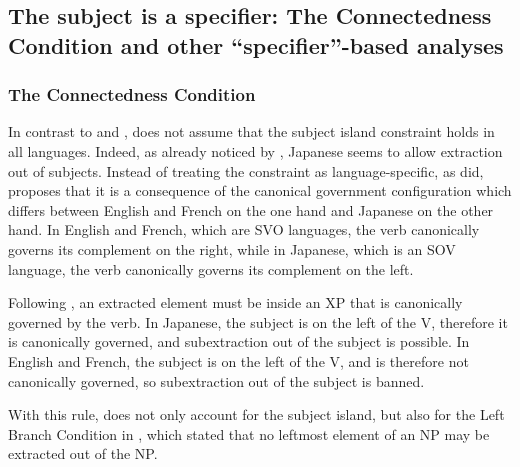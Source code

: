 
\subsection{The subject is a specifier: The Connectedness Condition and other ``specifier''-based analyses}

\subsubsection{The Connectedness Condition}

In contrast to \citeauthor{Chomsky.1973} and \citeauthor{Huang.1982}, \citet{Kayne.1983} does not assume that the subject island constraint holds in all languages. Indeed, as already noticed by \citet{Ross.1967}, Japanese seems to allow extraction out of subjects. Instead of treating the constraint as language-specific, as \citeauthor{Ross.1967} did, \citeauthor{Kayne.1983} proposes that it is a consequence of the canonical government configuration which differs between English and French on the one hand and Japanese on the other hand. In English and French, which are SVO languages, the verb canonically governs its complement on the right, while in Japanese, which is an SOV language, the verb canonically governs its complement on the left.

Following \citet[225]{Kayne.1983}, an extracted element must be inside an XP that is canonically governed by the verb. In Japanese, the subject is on the left of the V, therefore it is canonically governed, and subextraction out of the subject is possible. In English and French, the subject is on the left of the V, and is therefore not canonically governed, so subextraction out of the subject is banned.

With this rule, \citet{Kayne.1983} does not only account for the subject island, but also for the Left Branch Condition in \citet[207--217]{Ross.1967}, which stated that no leftmost element of an NP may be extracted out of the NP. 

\begin{exe} \ex \citep[208]{Ross.1967}
\begin{xlist}
\end{xlist}
\end{exe}

